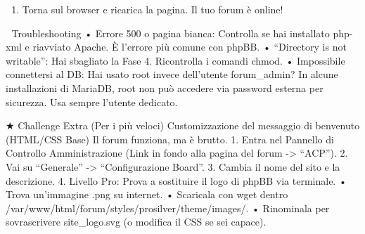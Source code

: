 \documentclass[11pt,a4paper]{article}
\providecommand{\tightlist}{%
  \setlength{\itemsep}{0pt}\setlength{\parskip}{0pt}}
\begin{document}
\begin{enumerate}
\def\labelenumi{\arabic{enumi}.}
\setcounter{enumi}{2}
\tightlist
\item
  Torna sul browser e ricarica la pagina. Il tuo forum è online!
\end{enumerate}

🔎 Troubleshooting • Errore 500 o pagina bianca: Controlla se hai
installato php-xml e riavviato Apache. È l'errore più comune con phpBB.
• ``Directory is not writable'': Hai sbagliato la Fase 4. Ricontrolla i
comandi chmod. • Impossibile connettersi al DB: Hai usato root invece
dell'utente forum\_admin? In alcune installazioni di MariaDB, root non
può accedere via password esterna per sicurezza. Usa sempre l'utente
dedicato.

★ Challenge Extra (Per i più veloci) Customizzazione del messaggio di
benvenuto (HTML/CSS Base) Il forum funziona, ma è brutto. 1. Entra nel
Pannello di Controllo Amministrazione (Link in fondo alla pagina del
forum -\textgreater{} ``ACP''). 2. Vai su ``Generale'' -\textgreater{}
``Configurazione Board''. 3. Cambia il nome del sito e la descrizione.
4. Livello Pro: Prova a sostituire il logo di phpBB via terminale. •
Trova un'immagine .png su internet. • Scaricala con wget dentro
/var/www/html/forum/styles/prosilver/theme/images/. • Rinominala per
sovrascrivere site\_logo.svg (o modifica il CSS se sei capace).


\end{document}
